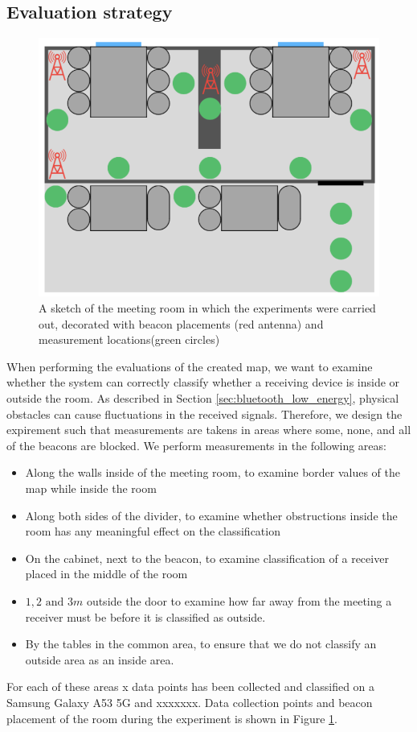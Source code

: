 \subsection{Evaluation strategy} %
\begin{figure}[h]
    \centering
    \includegraphics[scale=0.7]{images/experiment_setup.png}
    \caption{A sketch of the meeting room in which the experiments were carried out, decorated with beacon placements (red antenna) and measurement locations(green circles)}
    \label{fig:experiment_setup}
\end{figure}
When performing the evaluations of the created map, we want to examine whether the system can correctly classify whether a receiving device is inside or outside the room.
As described in Section \ref{sec:bluetooth_low_energy}, physical obstacles can cause fluctuations in the received signals. 
Therefore, we design the expirement such that measurements are takens in areas where some, none, and all of the beacons are blocked. 
We perform measurements in the following areas:
\begin{itemize}
    \item Along the walls inside of the meeting room, to examine border values of the map while inside the room
    \item Along both sides of the divider, to examine whether obstructions inside the room has any meaningful effect on the classification
    \item On the cabinet, next to the beacon, to examine classification of a receiver placed in the middle of the room
    \item $1,2 \text{ and } 3m$ outside the door to examine how far away from the meeting a receiver must be before it is classified as outside.
    \item By the tables in the common area, to ensure that we do not classify an outside area as an inside area.
\end{itemize}
For each of these areas x  data points has been collected and classified on a Samsung Galaxy A53 5G and xxxxxxx.
Data collection points and beacon placement of the room during the experiment is shown in Figure \ref{fig:experiment_setup}. 
